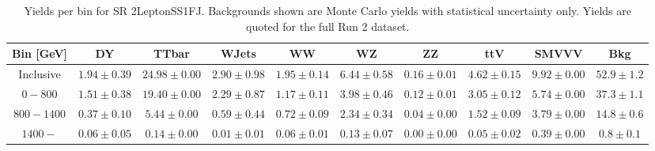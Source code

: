 \begin{table}[!htbp]
    \small
    \center
    \begin{tabular}{c|c|c|c|c|c|c|c|c||c}
    Bin [GeV] & DY & TTbar & WJets & WW & WZ & ZZ & ttV & SMVVV & Bkg\\
    \hline
    Inclusive & $1.94 \pm 0.39$ & $24.98 \pm 0.00$ & $2.90 \pm 0.98$ & $1.95 \pm 0.14$ & $6.44 \pm 0.58$ & $0.16 \pm 0.01$ & $4.62 \pm 0.15$ & $9.92 \pm 0.00$ & $52.9 \pm 1.2$\\
    \hline
    $0-800$ & $1.51 \pm 0.38$ & $19.40 \pm 0.00$ & $2.29 \pm 0.87$ & $1.17 \pm 0.11$ & $3.98 \pm 0.46$ & $0.12 \pm 0.01$ & $3.05 \pm 0.12$ & $5.74 \pm 0.00$ & $37.3 \pm 1.1$\\
    \hline
    $800-1400$ & $0.37 \pm 0.10$ & $5.44 \pm 0.00$ & $0.59 \pm 0.44$ & $0.72 \pm 0.09$ & $2.34 \pm 0.34$ & $0.04 \pm 0.00$ & $1.52 \pm 0.09$ & $3.79 \pm 0.00$ & $14.8 \pm 0.6$\\
    \hline
    $1400-$ & $0.06 \pm 0.05$ & $0.14 \pm 0.00$ & $0.01 \pm 0.01$ & $0.06 \pm 0.01$ & $0.13 \pm 0.07$ & $0.00 \pm 0.00$ & $0.05 \pm 0.02$ & $0.39 \pm 0.00$ & $0.8 \pm 0.1$\\
\end{tabular}
    \caption{Yields per bin for SR 2LeptonSS1FJ. Backgrounds shown are Monte Carlo yields with statistical uncertainty only. Yields are quoted for the full Run 2 dataset.}
    \label{tab:2LeptonSS1FJ$bins}
\end{table}
